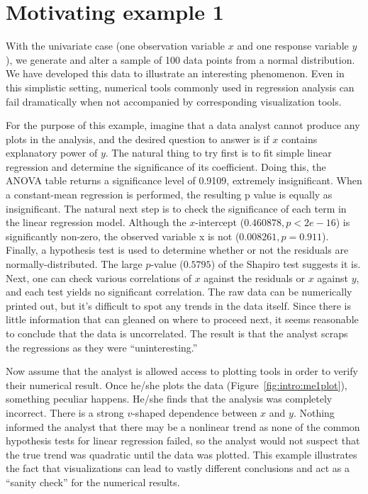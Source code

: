 \section{Motivating example 1}
\label{sec:intro:me1}

With the univariate case (one observation variable $x$ and one response variable $y$), we generate and alter a sample of 100 data points from a normal distribution. We have developed this data to illustrate an interesting phenomenon. Even in this simplistic setting, numerical tools commonly used in regression analysis can fail dramatically when not accompanied by corresponding visualization tools.

For the purpose of this example, imagine that a data analyst cannot produce any plots in the analysis, and the desired question to answer is if $x$ contains explanatory power of $y$. The natural thing to try first is to fit simple linear regression and determine the significance of its coefficient. Doing this, the ANOVA table returns a significance level of 0.9109, extremely insignificant. When a constant-mean regression is performed, the resulting p value is equally as insignificant. The natural next step is to check the significance of each term in the linear regression model. Although the $x$-intercept ($0.460878, p < 2e-16$) is significantly non-zero, the observed variable x is not ($0.008261, p = 0.911$). Finally, a hypothesis test is used to determine whether or not the residuals are normally-distributed. The large $p$-value ($0.5795$) of the Shapiro test suggests it is. Next, one can check various correlations of $x$ against the residuals or $x$ against $y$, and each test yields no significant correlation. The raw data can be numerically printed out, but it's difficult to spot any trends in the data itself. Since there is little information that can gleaned on where to proceed next, it seems reasonable to conclude that the data is uncorrelated. The result is that the analyst scraps the regressions as they were ``uninteresting.''

Now assume that the analyst is allowed access to plotting tools in order to verify their numerical result. Once he/she plots the data (Figure~\ref{fig:intro:me1plot}), something peculiar happens. He/she finds that the analysis was completely incorrect. There is a strong $v$-shaped dependence between $x$ and $y$.  Nothing informed the analyst that there may be a nonlinear trend as none of the common hypothesis tests for linear regression failed, so the analyst would not suspect that the true trend was quadratic until the data was plotted. This example illustrates the fact that visualizations can lead to vastly different conclusions and act as a ``sanity check'' for the numerical results. 

